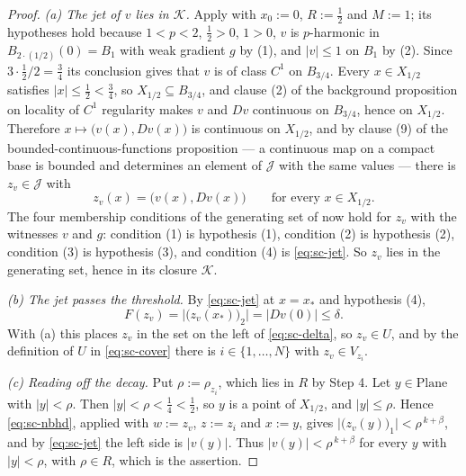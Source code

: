 \begin{proof}
\emph{(a) The jet of $v$ lies in $\mathcal{K}$.}  Apply
 with $x_0:=0$, $R:=\tfrac12$ and $M:=1$; its hypotheses hold
because $1<p<2$, $\tfrac12>0$, $1>0$, $v$ is $p$-harmonic in $B_{2\cdot(1/2)}(0)=B_1$ with weak
gradient $g$ by (1), and $\lvert v\rvert\le1$ on $B_1$ by (2).  Since $3\cdot\tfrac12/2=\tfrac34$
its conclusion gives that $v$ is of class $C^{1}$ on $B_{3/4}$.  Every $x\in X_{1/2}$ satisfies
$\lvert x\rvert\le\tfrac12<\tfrac34$, so $X_{1/2}\subseteq B_{3/4}$, and clause (2) of the
background proposition on locality of $C^{1}$ regularity makes $v$ and $Dv$ continuous on
$B_{3/4}$, hence on $X_{1/2}$.  Therefore $x\mapsto\bigl(v(x),Dv(x)\bigr)$ is continuous on
$X_{1/2}$, and by clause (9) of the bounded-continuous-functions proposition --- a continuous map
on a compact base is bounded and determines an element of $\mathcal{J}$ with the same values ---
there is $z_v\in\mathcal{J}$ with
\begin{equation}\label{eq:sc-jet}
  z_v(x)=\bigl(v(x),Dv(x)\bigr)\qquad\text{for every }x\in X_{1/2}.
\end{equation}
The four membership conditions of the generating set of  now hold for
$z_v$ with the witnesses $v$ and $g$: condition (1) is hypothesis (1), condition (2) is
hypothesis (2), condition (3) is hypothesis (3), and condition (4) is \eqref{eq:sc-jet}.  So
$z_v$ lies in the generating set, hence in its closure $\mathcal{K}$.

\emph{(b) The jet passes the threshold.}  By \eqref{eq:sc-jet} at $x=x_\ast$ and hypothesis (4),
\[
  F(z_v)=\bigl\lvert\bigl(z_v(x_\ast)\bigr)_2\bigr\rvert=\lvert Dv(0)\rvert\le\delta .
\]
With (a) this places $z_v$ in the set on the left of \eqref{eq:sc-delta}, so $z_v\in U$, and by
the definition of $U$ in \eqref{eq:sc-cover} there is $i\in\{1,\ldots,N\}$ with
$z_v\in V_{z_i}$.

\emph{(c) Reading off the decay.}  Put $\rho:=\rho_{z_i}$, which lies in $R$ by Step 4.  Let
$y\in\mathrm{Plane}$ with $\lvert y\rvert<\rho$.  Then $\lvert y\rvert<\rho<\tfrac14<\tfrac12$,
so $y$ is a point of $X_{1/2}$, and $\lvert y\rvert\le\rho$.  Hence \eqref{eq:sc-nbhd}, applied
with $w:=z_v$, $z:=z_i$ and $x:=y$, gives
$\bigl\lvert\bigl(z_v(y)\bigr)_1\bigr\rvert<\rho^{\,k+\beta}$, and by \eqref{eq:sc-jet} the left
side is $\lvert v(y)\rvert$.  Thus $\lvert v(y)\rvert<\rho^{\,k+\beta}$ for every $y$ with
$\lvert y\rvert<\rho$, with $\rho\in R$, which is the assertion.
\end{proof}
